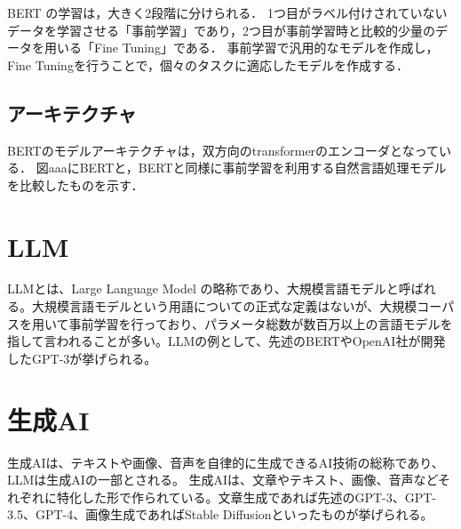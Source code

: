 BERT の学習は，大きく2段階に分けられる．
1つ目がラベル付けされていないデータを学習させる「事前学習」であり，2つ目が事前学習時と比較的少量のデータを用いる「Fine Tuning」である．
事前学習で汎用的なモデルを作成し，Fine Tuningを行うことで，個々のタスクに適応したモデルを作成する．

\subsection{アーキテクチャ}
BERTのモデルアーキテクチャは，双方向のtransformerのエンコーダとなっている．
図aaaにBERTと，BERTと同様に事前学習を利用する自然言語処理モデルを比較したものを示す．






\section{LLM \label{c4s6}}
LLMとは、Large Language Model の略称であり、大規模言語モデルと呼ばれる。大規模言語モデルという用語についての正式な定義はないが、大規模コーパスを用いて事前学習を行っており、パラメータ総数が数百万以上の言語モデルを指して言われることが多い。LLMの例として、先述のBERTやOpenAI社が開発したGPT-3が挙げられる。

\section{生成AI \label{c4s7}}
生成AIは、テキストや画像、音声を自律的に生成できるAI技術の総称であり、LLMは生成AIの一部とされる。
生成AIは、文章やテキスト、画像、音声などそれぞれに特化した形で作られている。文章生成であれば先述のGPT-3、GPT-3.5、GPT-4、画像生成であればStable Diffusionといったものが挙げられる。


